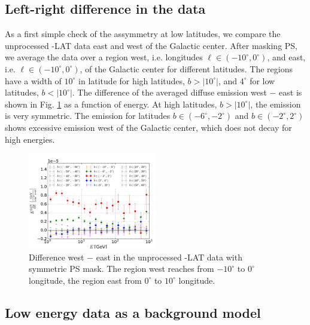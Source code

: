 \subsection{Left-right difference in the data}
\label{sec:data_diff}

As a first simple check of the assymmetry at low latitudes, we compare the unprocessed \Fermi-LAT data east and west of the Galactic center. After masking PS, we average the data over a region west, i.e. longitudes $\ell \in (-10^\circ, 0^\circ)$, and east, i.e. $\ell \in (-10^\circ, 0^\circ)$, of the Galactic center for different latitudes. The regions have a width of $10^\circ$ in latitude for high latitudes, $b >|10^\circ|$, and $4^\circ$ for low latitudes, $b <|10^\circ|$. The difference of the averaged diffuse emission west $-$ east is shown in Fig. \ref{fig:data_diff} as a function of energy. At high latitudes, $b >|10^\circ|$, the emission is very symmetric. The emission for latitudes $b \in (-6^\circ, -2^\circ)$ and $b \in (-2^\circ, 2^\circ)$ shows excessive emission west of the Galactic center, which does not decay for high energies. 


\begin{figure}[h]
 \includegraphics[width=0.5\textwidth]{plots/Difference_data_for_different_latitudes.pdf}
 \caption{Difference west $-$ east in the unprocessed \Fermi-LAT data with symmetric PS mask. The region west reaches from $-10^\circ$ to $0^\circ$ longitude, the region east from $0^\circ$ to $10^\circ$ longitude.}
 \label{fig:data_diff}
\end{figure}

\subsection{Low energy data as a background model}
\label{sec:le_data_model}


